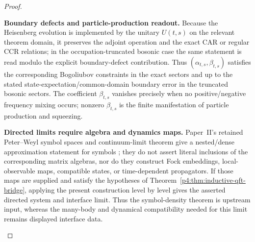 \documentclass[12pt,a4paper]{article}
\begin{document}
\begin{proof}
\begin{proofsteps}
\item \textbf{Boundary defects and particle-production readout.}
Because the Heisenberg evolution is implemented by the unitary \(U(t,s)\)
on the relevant theorem domain, it preserves the adjoint operation and the
exact CAR or regular CCR relations; in the occupation-truncated bosonic case
the same statement is read modulo the explicit boundary-defect contribution.
Thus \((\alpha_{t,s},\beta_{t,s})\) satisfies the corresponding Bogoliubov
constraints in the exact sectors and up to the stated
state-expectation/common-domain boundary error in the truncated bosonic
sectors.
The coefficient \(\beta_{t,s}\) vanishes precisely when no positive/negative frequency mixing occurs; nonzero \(\beta_{t,s}\) is the finite manifestation of particle production and squeezing.


\item \textbf{Directed limits require algebra and dynamics maps.}
Paper~II's retained Peter--Weyl symbol spaces and continuum-limit theorem
give a nested/dense approximation statement for symbols
\cite{Kugelmann2026b}; they do not assert literal inclusions of the
corresponding matrix algebras, nor do they construct Fock embeddings,
local-observable maps, compatible states, or time-dependent propagators.
If those maps are supplied and satisfy the hypotheses of
Theorem~\ref{p4:thm:inductive-qft-bridge}, applying the present construction
level by level gives the asserted directed system and interface limit.
Thus the symbol-density theorem is upstream input, whereas the many-body
and dynamical compatibility needed for this limit remains displayed
interface data.
\end{proofsteps}

\end{proof}
\end{document}

